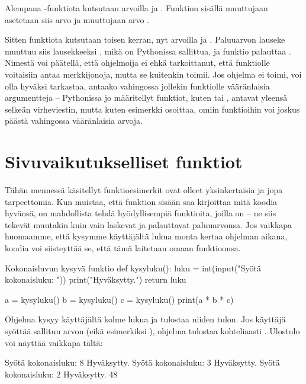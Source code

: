 Alempana -funktiota kutsutaan arvoilla  ja . Funktion sisällä muuttujaan  asetetaan siis arvo  ja muuttujaan  arvo .

Sitten funktiota kutsutaan toisen kerran, nyt arvoilla  ja . Paluuarvon lauseke  muuttuu siis lausekkeeksi , mikä on Pythonissa sallittua, ja funktio palauttaa . Nimestä voi päätellä, että ohjelmoija ei ehkä tarkoittanut, että funktiolle voitaisiin antaa merkkijonoja, mutta se kuitenkin toimii. Jos ohjelma ei toimi, voi olla hyväksi tarkastaa, antaako vahingossa jollekin funktiolle vääränlaisia argumentteja -- Pythonissa jo määritellyt funktiot, kuten  tai , antavat yleensä selkeän virheviestin, mutta kuten esimerkki osoittaa, omiin funktioihin voi joskus päästä vahingossa vääränlaisia arvoja.

\section{Sivuvaikutukselliset funktiot}

Tähän mennessä käsitellyt funktioesimerkit ovat olleet yksinkertaisia ja jopa tarpeettomia. Kun muistaa, että funktion sisään saa kirjoittaa mitä koodia hyvänsä, on mahdollista tehdä hyödyllisempiä funktioita, joilla on  -- ne siis tekevät muutakin kuin vain laskevat ja palauttavat paluuarvonsa. Jos vaikkapa huomaamme, että kysymme käyttäjältä lukua monta kertaa ohjelman aikana, koodia voi siisteyttää se, että tämä laitetaan omaan funktioonsa.

\begin{example}{Kokonaisluvun kysyvä funktio}
def kysyluku():
	luku = int(input("Syötä kokonaisluku: "))
	print("Hyväksytty.")
	return luku

a = kysyluku()
b = kysyluku()
c = kysyluku()
print(a * b * c)
\end{example}

Ohjelma kysyy käyttäjältä kolme lukua ja tulostaa niiden tulon. Jos käyttäjä syöttää sallitun arvon (eikä esimerkiksi ), ohjelma tulostaa kohteliaasti . Ulostulo voi näyttää vaikkapa tältä:

\begin{output}
Syötä kokonaisluku: 8
Hyväksytty.
Syötä kokonaisluku: 3
Hyväksytty.
Syötä kokonaisluku: 2
Hyväksytty.
48
\end{output}

